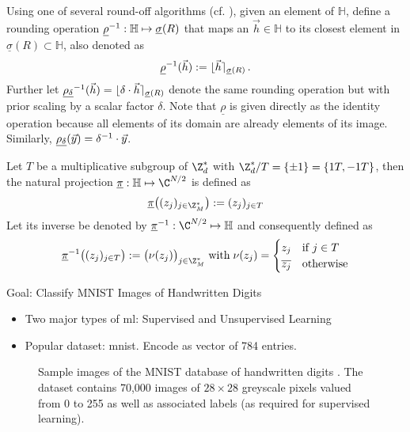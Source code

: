 \begin{frame}[c]
  \begin{definition}
    Using one of several round-off algorithms (cf. \cite{2013-rlwe-toolkit}), given an element of $\mathbb{H}$, define a rounding operation $\underline{\rho}^{-1}: \mathbb{H} \mapsto \underline{\sigma}(R)$ that maps an $\vec{h} \in \mathbb{H}$ to its closest element in $\underline{\sigma}(R) \subset \mathbb{H}$, also denoted as
    $$\underline{\rho}^{-1}(\vec{h}) := \lfloor \vec{h} \rceil_{\underline{\sigma}(R)}\,.$$
    Further let $\underline{\rho_\delta}^{-1}(\vec{h}) = \lfloor \delta \cdot \vec{h} \rceil_{\underline{\sigma}(R)}$ denote the same rounding operation but with prior scaling by a scalar factor $\delta$.
    Note that $\underline{\rho}$ is given directly as the identity operation because all elements of its domain are already elements of its image. Similarly, $\underline{\rho_\delta}(\vec{y}) = \delta^{-1} \cdot \vec{y}$.
  \end{definition}
\end{frame}

\begin{frame}[c]
  \begin{definition}
    Let $T$ be a multiplicative subgroup of $\Z_d^*$ with $\Z_d^* / T = \{\pm 1\} = \{1T, -1T\}$, then the natural projection $\underline{\pi}: \mathbb{H} \mapsto \C^{N/2}$ is defined as
    $$\underline{\pi}\big((z_j)_{j \in \Z_M^*}\big) := (z_j)_{j \in T}$$
    Let its inverse be denoted by $\underline{\pi}\inv: \C^{N/2} \mapsto \mathbb{H}$ and consequently defined as
    $$\underline{\pi}\inv\big((z_j)_{j \in T}\big) := \big(\nu(z_j)\big)_{j \in \Z_M^*} \; \mathrm{with} \; \nu(z_j) = \begin{cases}
        z_j            & \text{if } j \in T \\
        \overline{z_j} & \text{otherwise}
      \end{cases}$$
  \end{definition}
\end{frame}

\begin{frame}{Goal: Classify MNIST Images of Handwritten Digits}
  \begin{itemize}
    \item Two major types of \gls{ml}: Supervised and Unsupervised Learning
    \item Popular dataset: \gls{mnist}. Encode as vector of 784 entries.
  \end{itemize}

  \begin{figure}[H]
    \centering
    \caption[Sample images of the MNIST dataset]{
      Sample images of the MNIST database of handwritten digits \parencite{mnist-original}.
      The dataset contains 70,000 images of $28 \times 28$ greyscale pixels valued from 0 to 255 as well as associated labels (as required for supervised learning).
    }
    \label{fig:mnist}
  \end{figure}
\end{frame}

